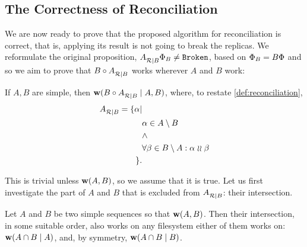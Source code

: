 
\subsection{The Correctness of Reconciliation}


We are now ready to prove that the proposed algorithm for reconciliation is correct,
that is, applying its result is not going to break the replicas.
We reformulate the original proposition, ${A}^{}_{\mathcal{R}|{B}}\Phi_B\neq\mathtt{Broken}$,
based on $\Phi_B=B\Phi$ and so we aim to prove that
$B\circ{A}^{}_{\mathcal{R}|{B}}$ works wherever $A$ and $B$ work:

\begin{myth}
If $A, B$ are simple, then $\mathbf{w}({B\circ {A}^{}_{\mathcal{R}|{B}}}\mathrel{|}{A,B})$,
where, to restate \cref{def:reconciliation},
\begin{align*}
{A}^{}_{\mathcal{R}|{B}} = \{\alpha| & \\
& \alpha\in A\setminus B \\
& \wedge \\
& \forall \beta\in B\setminus A: \alpha\mathrel{\wr\wr}\beta\\
\}. &
\end{align*}
\end{myth}

This is trivial unless $\mathbf{w}({A,B})$, so we assume that it is true.
Let us first investigate the part of $A$ and $B$ that is excluded from
${A}^{}_{\mathcal{R}|{B}}$: their intersection.

\begin{mylem}\label{can_move_intersection}
Let $A$ and $B$ be two simple sequences so that $\mathbf{w}({A, B})$.
Then their intersection, in some suitable order, also works on any filesystem
either of them works on:
$\mathbf{w}({A\cap B}\mathrel{|}{A})$, and, by symmetry,
$\mathbf{w}({A\cap B}\mathrel{|}{B})$.
\end{mylem}

